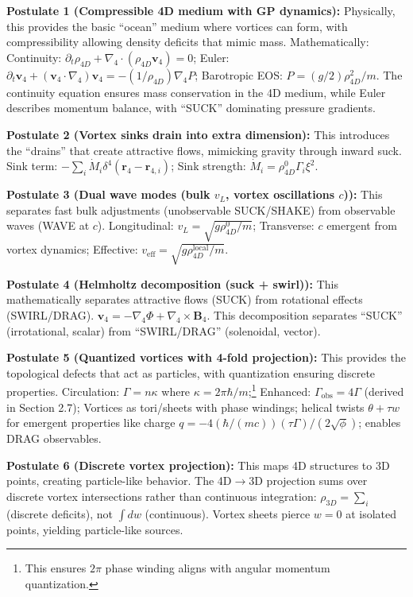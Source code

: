 \begin{tcolorbox}
\textbf{Postulate 1 (Compressible 4D medium with GP dynamics):} Physically, this provides the basic ``ocean'' medium where vortices can form, with compressibility allowing density deficits that mimic mass. Mathematically: Continuity: $\partial_t \rho_{4D} + \nabla_4 \cdot (\rho_{4D} \mathbf{v}_4) = 0$; Euler: $\partial_t \mathbf{v}_4 + (\mathbf{v}_4 \cdot \nabla_4) \mathbf{v}_4 = -(1/\rho_{4D}) \nabla_4 P$; Barotropic EOS: $P = (g/2) \rho_{4D}^2/m$. The continuity equation ensures mass conservation in the 4D medium, while Euler describes momentum balance, with ``SUCK'' dominating pressure gradients.

\textbf{Postulate 2 (Vortex sinks drain into extra dimension):} This introduces the ``drains'' that create attractive flows, mimicking gravity through inward suck. Sink term: $-\sum_i \dot{M}_i \delta^4(\mathbf{r}_4 - \mathbf{r}_{4,i})$; Sink strength: $\dot{M}_i = \rho_{4D}^0 \Gamma_i \xi^2$.

\textbf{Postulate 3 (Dual wave modes (bulk $v_L$, vortex oscillations $c$)):} This separates fast bulk adjustments (unobservable SUCK/SHAKE) from observable waves (WAVE at $c$). Longitudinal: $v_L = \sqrt{g \rho_{4D}^0 / m}$; Transverse: $c$ emergent from vortex dynamics; Effective: $v_{\text{eff}} = \sqrt{g \rho_{4D}^{\text{local}} / m}$.

\textbf{Postulate 4 (Helmholtz decomposition (suck + swirl)):} This mathematically separates attractive flows (SUCK) from rotational effects (SWIRL/DRAG). $\mathbf{v}_4 = -\nabla_4 \Phi + \nabla_4 \times \mathbf{B}_4$. This decomposition separates ``SUCK'' (irrotational, scalar) from ``SWIRL/DRAG'' (solenoidal, vector).

\textbf{Postulate 5 (Quantized vortices with 4-fold projection):} This provides the topological defects that act as particles, with quantization ensuring discrete properties. Circulation: $\Gamma = n \kappa$ where $\kappa = 2\pi \hbar / m$;\footnote{This ensures $2\pi$ phase winding aligns with angular momentum quantization.} Enhanced: $\Gamma_{\text{obs}} = 4 \Gamma$ (derived in Section 2.7); Vortices as tori/sheets with phase windings; helical twists $\theta + \tau w$ for emergent properties like charge $q = -4 (\hbar / (m c)) (\tau \Gamma) / (2 \sqrt{\phi})$; enables DRAG observables.

\textbf{Postulate 6 (Discrete vortex projection):} This maps 4D structures to 3D points, creating particle-like behavior. The 4D$\to$3D projection sums over discrete vortex intersections rather than continuous integration: $\rho_{3D} = \sum_i$ (discrete deficits), not $\int dw$ (continuous). Vortex sheets pierce $w=0$ at isolated points, yielding particle-like sources.
\end{tcolorbox}

